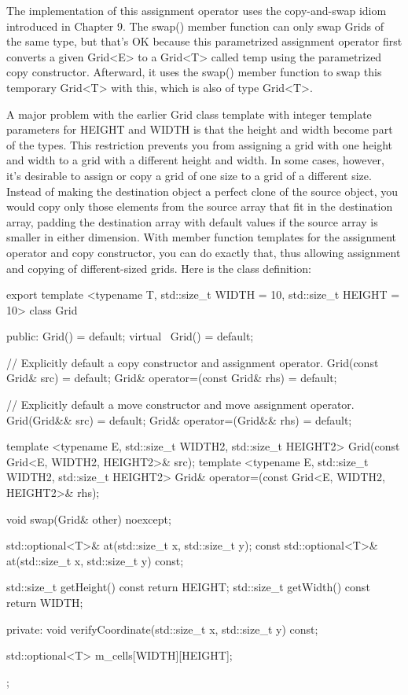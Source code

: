 The implementation of this assignment operator uses the copy-and-swap idiom introduced in Chapter 9. The swap() member function can only swap Grids of the same type, but that’s OK because this parametrized assignment operator first converts a given Grid<E> to a Grid<T> called temp using the parametrized copy constructor. Afterward, it uses the swap() member function to swap this temporary Grid<T> with this, which is also of type Grid<T>.


A major problem with the earlier Grid class template with integer template parameters for HEIGHT and WIDTH is that the height and width become part of the types. This restriction prevents you from assigning a grid with one height and width to a grid with a different height and width. In some cases, however, it’s desirable to assign or copy a grid of one size to a grid of a different size. Instead of making the destination object a perfect clone of the source object, you would copy only those elements from the source array that fit in the destination array, padding the destination array with default values if the source array is smaller in either dimension. With member function templates for the assignment operator and copy constructor, you can do exactly that, thus allowing assignment and copying of different-sized grids. Here is the class definition:

\begin{cpp}
export template <typename T, std::size_t WIDTH = 10, std::size_t HEIGHT = 10>
class Grid
{
    public:
        Grid() = default;
        virtual ~Grid() = default;

        // Explicitly default a copy constructor and assignment operator.
        Grid(const Grid& src) = default;
        Grid& operator=(const Grid& rhs) = default;

        // Explicitly default a move constructor and move assignment operator.
        Grid(Grid&& src) = default;
        Grid& operator=(Grid&& rhs) = default;

        template <typename E, std::size_t WIDTH2, std::size_t HEIGHT2>
        Grid(const Grid<E, WIDTH2, HEIGHT2>& src);
        template <typename E, std::size_t WIDTH2, std::size_t HEIGHT2>
        Grid& operator=(const Grid<E, WIDTH2, HEIGHT2>& rhs);

        void swap(Grid& other) noexcept;

        std::optional<T>& at(std::size_t x, std::size_t y);
        const std::optional<T>& at(std::size_t x, std::size_t y) const;

        std::size_t getHeight() const { return HEIGHT; }
        std::size_t getWidth() const { return WIDTH; }

    private:
        void verifyCoordinate(std::size_t x, std::size_t y) const;

        std::optional<T> m_cells[WIDTH][HEIGHT];
};
\end{cpp}

